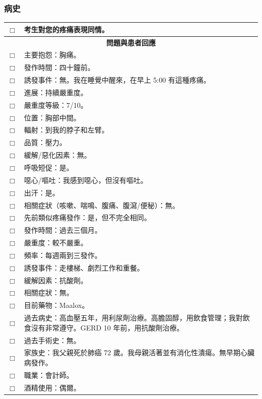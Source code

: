 \documentclass{article}
\newcommand{\checkbox}{\ensuremath{\Box}}
\begin{document}
\subsubsection{病史}
\begin{longtable}{p{} p{}}
\toprule
\checkbox & 考生對您的疼痛表現同情。 \\
\midrule
\multicolumn{2}{c}{\textbf{問題與患者回應}} \\
\midrule
\checkbox & 主要抱怨：胸痛。 \\
\checkbox & 發作時間：四十鐘前。 \\
\checkbox & 誘發事件：無。我在睡覺中醒來，在早上 5:00 有這種疼痛。 \\
\checkbox & 進展：持續嚴重度。 \\
\checkbox & 嚴重度等級：7/10。 \\
\checkbox & 位置：胸部中間。 \\
\checkbox & 輻射：到我的脖子和左臂。 \\
\checkbox & 品質：壓力。 \\
\checkbox & 緩解/惡化因素：無。 \\
\checkbox & 呼吸短促：是。 \\
\checkbox & 噁心/嘔吐：我感到噁心，但沒有嘔吐。 \\
\checkbox & 出汗：是。 \\
\checkbox & 相關症狀（咳嗽、喘鳴、腹痛、腹瀉/便秘）：無。 \\
\checkbox & 先前類似疼痛發作：是，但不完全相同。 \\
\checkbox & 發作時間：過去三個月。 \\
\checkbox & 嚴重度：較不嚴重。 \\
\checkbox & 頻率：每週兩到三發作。 \\
\checkbox & 誘發事件：走樓梯、劇烈工作和重餐。 \\
\checkbox & 緩解因素：抗酸劑。 \\
\checkbox & 相關症狀：無。 \\
\checkbox & 目前藥物：Maalox。 \\
\checkbox & 過去病史：高血壓五年，用利尿劑治療。高膽固醇，用飲食管理；我對飲食沒有非常遵守。GERD 10 年前，用抗酸劑治療。 \\
\checkbox & 過去手術史：無。 \\
\checkbox & 家族史：我父親死於肺癌 72 歲。我母親活著並有消化性潰瘍。無早期心臟病發作。 \\
\checkbox & 職業：會計師。 \\
\checkbox & 酒精使用：偶爾。 \\

\end{longtable}
\end{document}
